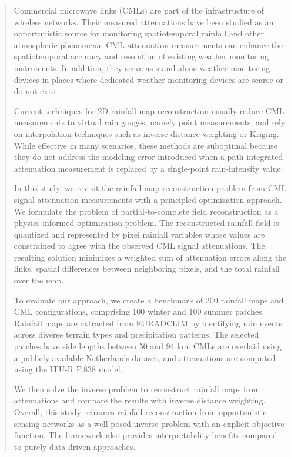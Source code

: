 \documentclass[a4paper,fleqn]{cas-sc}
\begin{document}
\begin{abstract}
  Commercial microwave links (CMLs) are part of the infrastructure of wireless networks. Their measured attenuations have been studied as an opportunistic source for monitoring spatiotemporal rainfall and other atmospheric phenomena. CML attenuation measurements can enhance the spatiotemporal accuracy and resolution of existing weather monitoring instruments. In addition, they serve as stand-alone weather monitoring devices in places where dedicated weather monitoring devices are scarce or do not exist.

  Current techniques for 2D rainfall map reconstruction usually reduce CML measurements to virtual rain gauges, namely point measurements, and rely on interpolation techniques such as inverse distance weighting or Kriging. While effective in many scenarios, these methods are suboptimal because they do not address the modeling error introduced when a path-integrated attenuation measurement is replaced by a single-point rain-intensity value.

  In this study, we revisit the rainfall map reconstruction problem from CML signal attenuation measurements with a principled optimization approach. We formulate the problem of partial-to-complete field reconstruction as a physics-informed optimization problem. The reconstructed rainfall field is quantized and represented by pixel rainfall variables whose values are constrained to agree with the observed CML signal attenuations. The resulting solution minimizes a weighted sum of attenuation errors along the links, spatial differences between neighboring pixels, and the total rainfall over the map.

  To evaluate our approach, we create a benchmark of 200 rainfall maps and CML configurations, comprising 100 winter and 100 summer patches. Rainfall maps are extracted from EURADCLIM by identifying rain events across diverse terrain types and precipitation patterns. The selected patches have side lengths between 50 and 94 km. CMLs are overlaid using a publicly available Netherlands dataset, and attenuations are computed using the ITU-R P.838 model.

  We then solve the inverse problem to reconstruct rainfall maps from attenuations and compare the results with inverse distance weighting. Overall, this study reframes rainfall reconstruction from opportunistic sensing networks as a well-posed inverse problem with an explicit objective function. The framework also provides interpretability benefits compared to purely data-driven approaches.
\end{abstract}
\end{document}
